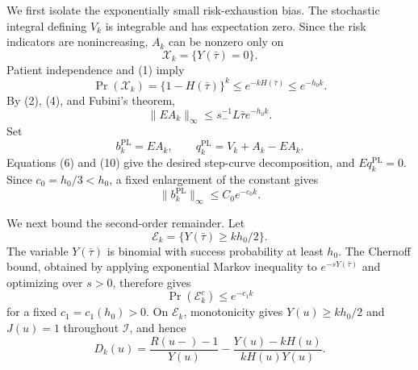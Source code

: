 We first isolate the exponentially small risk-exhaustion bias.  The stochastic integral defining \(V_k\) is integrable and has expectation zero.  Since the risk indicators are nonincreasing, \(A_k\) can be nonzero only on
\[
 \mathcal X_k=\{Y(\bar\tau)=0\}.
\]
Patient independence and (1) imply
\[
 \Pr(\mathcal X_k)=\{1-H(\bar\tau)\}^k
 \le e^{-kH(\bar\tau)}\le e^{-h_0k}.                         \tag{8}
\]
By (2), (4), and Fubini's theorem,
\[
 \|EA_k\|_\infty
 \le s_-^{-1}L\bar\tau e^{-h_0k}.                            \tag{9}
\]
Set
\[
 b_k^{\mathrm{PL}}=EA_k,
 \qquad
 q_k^{\mathrm{PL}}=V_k+A_k-EA_k.                             \tag{10}
\]
Equations (6) and (10) give the desired step-curve decomposition, and \(Eq_k^{\mathrm{PL}}=0\).  Since \(c_0=h_0/3<h_0\), a fixed enlargement of the constant gives
\[
 \|b_k^{\mathrm{PL}}\|_\infty\le C_0e^{-c_0k}.             \tag{11}
\]

We next bound the second-order remainder.  Let
\[
 \mathcal E_k=\{Y(\bar\tau)\ge kh_0/2\}.
\]
The variable \(Y(\bar\tau)\) is binomial with success probability at least \(h_0\).  The Chernoff bound, obtained by applying exponential Markov inequality to \(e^{-sY(\bar\tau)}\) and optimizing over \(s>0\), therefore gives
\[
 \Pr(\mathcal E_k^c)\le e^{-c_1k}                            \tag{12}
\]
for a fixed \(c_1=c_1(h_0)>0\).  On \(\mathcal E_k\), monotonicity gives \(Y(u)\ge kh_0/2\) and \(J(u)=1\) throughout \(\mathcal I\), and hence
\[
 D_k(u)=\frac{R(u-)-1}{Y(u)}
 -\frac{Y(u)-kH(u)}{kH(u)Y(u)}.                              \tag{13}
\]

